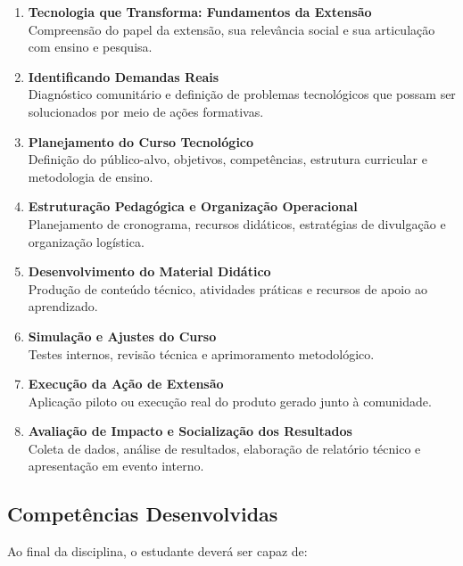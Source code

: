 \documentclass[12pt,a4paper]{article}
\begin{document}
\begin{enumerate}
    \item \textbf{Tecnologia que Transforma: Fundamentos da Extensão} \\
    Compreensão do papel da extensão, sua relevância social e sua articulação com ensino e pesquisa.

    \item \textbf{Identificando Demandas Reais} \\
    Diagnóstico comunitário e definição de problemas tecnológicos que possam ser solucionados por meio de ações formativas.

    \item \textbf{Planejamento do Curso Tecnológico} \\
    Definição do público-alvo, objetivos, competências, estrutura curricular e metodologia de ensino.

    \item \textbf{Estruturação Pedagógica e Organização Operacional} \\
    Planejamento de cronograma, recursos didáticos, estratégias de divulgação e organização logística.

    \item \textbf{Desenvolvimento do Material Didático} \\
    Produção de conteúdo técnico, atividades práticas e recursos de apoio ao aprendizado.

    \item \textbf{Simulação e Ajustes do Curso} \\
    Testes internos, revisão técnica e aprimoramento metodológico.

    \item \textbf{Execução da Ação de Extensão} \\
    Aplicação piloto ou execução real do produto gerado junto à comunidade.

    \item \textbf{Avaliação de Impacto e Socialização dos Resultados} \\
    Coleta de dados, análise de resultados, elaboração de relatório técnico e apresentação em evento interno.
\end{enumerate}

\subsection*{Competências Desenvolvidas}

Ao final da disciplina, o estudante deverá ser capaz de:
\end{document}
